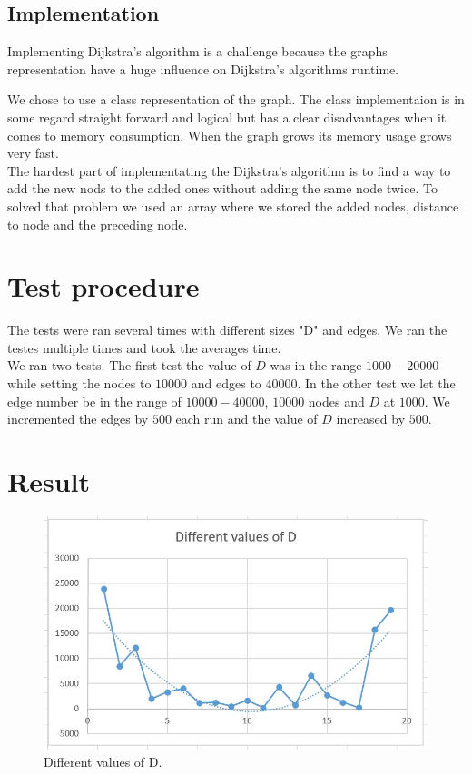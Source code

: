 \documentclass[paper=a4, fontsize=11pt]{scrartcl}
\numberwithin{equation}{section}		%
\numberwithin{figure}{section}			%
\numberwithin{table}{section}				%
\begin{document}
\subsection{Implementation}
Implementing Dijkstra’s algorithm is a challenge because the graphs representation have a huge influence on Dijkstra’s algorithms runtime.

 We chose to use a class representation of the graph. The class implementaion is in some regard straight forward and logical but has a clear disadvantages when it comes to memory consumption. When the graph grows its memory usage grows very fast.
\\

The hardest part of implementating the Dijkstra’s algorithm is to find a way to add the new nods to the added ones without adding the same node twice. To solved that problem we used an array where we stored the added nodes, distance to node and the preceding node.


\section{Test procedure}
The tests were ran several times with different sizes "D" and edges. We ran the testes multiple times and took the averages time.
\\
We ran two tests. The first test the value of $D$ was in the range $1 000-20 000$ while setting the nodes to $10 000$ and edges to $40 000$. In the other test we let the edge number be in the range of $10 000-40 000$, $10 000$ nodes and  $D$ at $1000$. We incremented the edges by $500$ each run and the value of $D$ increased by $500$.
\\

\section{Result}

\begin{figure}[h!]
  \includegraphics[width=\linewidth]{d.jpg}
  \caption{Different values of D.}
  \label{fig:result}
\end{figure}
\end{document}
